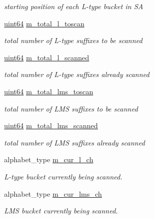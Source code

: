 \begin{DoxyCompactItemize}
\begin{DoxyCompactList}\small\item\em starting position of each L-\/type bucket in SA \end{DoxyCompactList}\item 
\hyperlink{types_8h_a60e8696a4678cd348e991a1f172e53f7}{uint64} \hyperlink{struct_validate4_1_1_r_scan_a4cc3c1365b0089fe9d7740fed39dd0a7}{m\+\_\+total\+\_\+l\+\_\+toscan}
\begin{DoxyCompactList}\small\item\em total number of L-\/type suffixes to be scanned \end{DoxyCompactList}\item 
\hyperlink{types_8h_a60e8696a4678cd348e991a1f172e53f7}{uint64} \hyperlink{struct_validate4_1_1_r_scan_ae0c9b8ab74cca6cebf6375cd772f1858}{m\+\_\+total\+\_\+l\+\_\+scanned}
\begin{DoxyCompactList}\small\item\em total number of L-\/type suffixes already scanned \end{DoxyCompactList}\item 
\hyperlink{types_8h_a60e8696a4678cd348e991a1f172e53f7}{uint64} \hyperlink{struct_validate4_1_1_r_scan_ae61305117585d96877b30800ea2479e4}{m\+\_\+total\+\_\+lms\+\_\+toscan}
\begin{DoxyCompactList}\small\item\em total number of L\+MS suffixes to be scanned \end{DoxyCompactList}\item 
\hyperlink{types_8h_a60e8696a4678cd348e991a1f172e53f7}{uint64} \hyperlink{struct_validate4_1_1_r_scan_a6451f758af2853be9d7aafc978001493}{m\+\_\+total\+\_\+lms\+\_\+scanned}
\begin{DoxyCompactList}\small\item\em total number of L\+MS suffixes already scanned \end{DoxyCompactList}\item 
alphabet\+\_\+type \hyperlink{struct_validate4_1_1_r_scan_a6ca7516c4fd64e5fe926636ac7197fda}{m\+\_\+cur\+\_\+l\+\_\+ch}
\begin{DoxyCompactList}\small\item\em L-\/type bucket currently being scanned. \end{DoxyCompactList}\item 
alphabet\+\_\+type \hyperlink{struct_validate4_1_1_r_scan_a8efbe937773c79d74f444e7f2c71fc8e}{m\+\_\+cur\+\_\+lms\+\_\+ch}
\begin{DoxyCompactList}\small\item\em L\+MS bucket currently being scanned. \end{DoxyCompactList}\item 

\end{DoxyCompactItemize}
